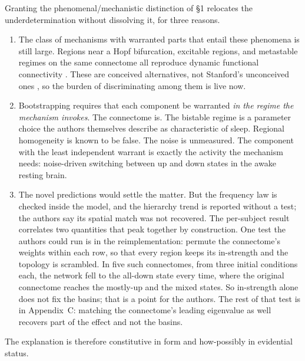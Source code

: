 \documentclass[11pt]{article}
\theoremstyle{definition}\newtheorem{observation}{Observation}
\theoremstyle{remark}\newtheorem{remark}{Remark}
\begin{document}
Granting the phenomenal/mechanistic distinction of \S1 relocates the underdetermination without dissolving it, for three reasons.
\begin{enumerate}
\item The class of mechanisms with warranted parts that entail these phenomena is still large. Regions near a Hopf bifurcation, excitable regions, and metastable regimes on the same connectome all reproduce dynamic functional connectivity \parencite{hansen2015,deco2017,messe2015}. These are conceived alternatives, not Stanford's unconceived ones \parencite{stanford2006}, so the burden of discriminating among them is live now.
\item Bootstrapping requires that each component be warranted \emph{in the regime the mechanism invokes}. The connectome is. The bistable regime is a parameter choice the authors themselves describe as characteristic of sleep. Regional homogeneity is known to be false. The noise is unmeasured. The component with the least independent warrant is exactly the activity the mechanism needs: noise-driven switching between up and down states in the awake resting brain.
\item The novel predictions would settle the matter. But the frequency law is checked inside the model, and the hierarchy trend is reported without a test; the authors say its spatial match was not recovered. The per-subject result correlates two quantities that peak together by construction. One test the authors could run is in the reimplementation: permute the connectome's weights within each row, so that every region keeps its in-strength and the topology is scrambled. In five such connectomes, from three initial conditions each, the network fell to the all-down state every time, where the original connectome reaches the mostly-up and the mixed states. So in-strength alone does not fix the basins; that is a point for the authors. The rest of that test is in Appendix~C: matching the connectome's leading eigenvalue as well recovers part of the effect and not the basins.
\end{enumerate}

The explanation is therefore constitutive in form and how-possibly in evidential status.
\end{document}
